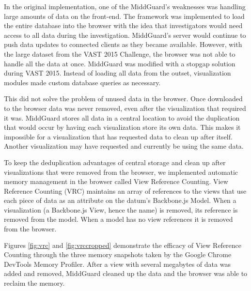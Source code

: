 \documentclass[midd]{thesis}
\begin{document}
In the original implementation, one of the MiddGuard's weaknesses was handling
large amounts of data on the front-end. The framework was implemented to load
the entire database into the browser with the idea that investigators would need
access to all data during the investigation. MiddGuard's server would continue
to push data updates to connected clients as they became available. However,
with the large dataset from the VAST 2015 Challenge, the browser was not able to
handle all the data at once. MiddGuard was modified with a stopgap solution
during VAST 2015. Instead of loading all data from the outset, visualization
modules made custom database queries as necessary.

This did not solve the problem of unused data in the browser. Once downloaded to
the browser data was never removed, even after the visualization that required
it was. MiddGuard stores all data in a central location to avoid the duplication
that would occur by having each visualization store its own data. This makes it
impossible for a visualization that has requested data to clean up after itself.
Another visualization may have requested and currently be using the same data.

To keep the deduplication advantages of central storage and clean up after
visualizations that were removed from the browser, we implemented automatic
memory management in the browser called View Reference Counting. View Reference
Counting (VRC) maintains an array of references to the views that use each piece
of data as an attribute on the datum's Backbone.js Model. When a visualization
(a Backbone.js View, hence the name) is removed, its reference is removed from
the model. When a model has no view references it is removed from the browser.

Figures \ref{fig:vrc} and \ref{fig:vrccropped} demonstrate the efficacy of View
Reference Counting through the three memory snapshots taken by the Google Chrome
DevTools Memory Profiler. After a view with several megabytes of data was added
and removed, MiddGuard cleaned up the data and the browser was able to reclaim
the memory.
\end{document}
